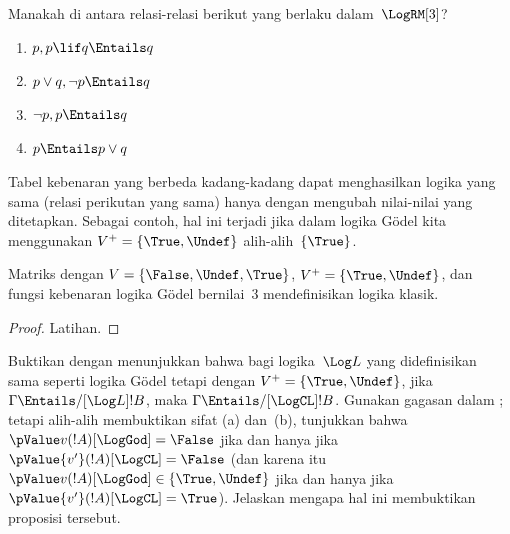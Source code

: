 \documentclass[../../../include/open-logic-section]{subfiles}
\begin{document}
\begin{prob}
  Manakah di antara relasi-relasi berikut yang berlaku dalam~$\LogRM[3]$?
  \begin{enumerate}
    \item $p,p\lif q\Entails q$
    \item $p\lor q,\lnot p\Entails q$
    \item $\lnot p,p\Entails q$
    \item $p\Entails p\lor q$
  \end{enumerate}
\end{prob}

Tabel kebenaran yang berbeda kadang-kadang dapat menghasilkan logika yang sama
(relasi perikutan yang sama) hanya dengan mengubah nilai-nilai yang ditetapkan.
Sebagai contoh, hal ini terjadi jika dalam logika G\"odel kita menggunakan
$V^+=\{\True,\Undef\}$ alih-alih~$\{\True\}$.

\begin{prop}
  Matriks dengan $V=\{\False,\Undef,\True\}$,
  $V^+=\{\True,\Undef\}$, dan fungsi kebenaran logika G\"odel bernilai~$3$
  mendefinisikan logika klasik.
\end{prop}

\begin{proof}
  Latihan.
\end{proof}

\begin{prob}
  Buktikan  dengan menunjukkan bahwa bagi
  logika~$\Log L$ yang didefinisikan sama seperti logika G\"odel tetapi dengan
  $V^+=\{\True,\Undef\}$, jika $\Gamma\Entails/[\Log L]!B$, maka
  $\Gamma\Entails/[\LogCL]!B$. Gunakan gagasan dalam
  ; tetapi alih-alih membuktikan sifat
  (a) dan~(b), tunjukkan bahwa $\pValue v(!A)[\LogGod]=\False$ jika dan hanya
  jika $\pValue{v'}(!A)[\LogCL]=\False$ (dan karena itu
  $\pValue v(!A)[\LogGod]\in\{\True,\Undef\}$ jika dan hanya jika
  $\pValue{v'}(!A)[\LogCL]=\True$). Jelaskan mengapa hal ini membuktikan
  proposisi tersebut.
\end{prob}
\end{document}
